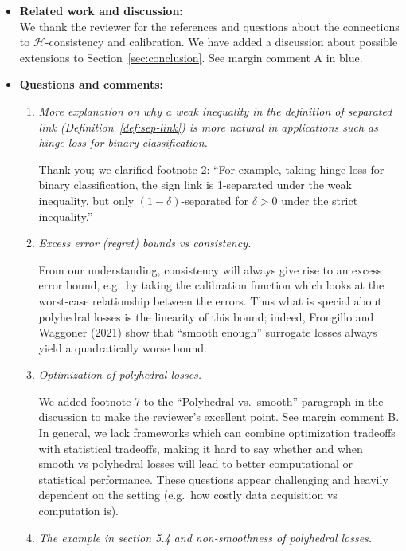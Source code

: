 \documentclass[a4paper]{article}
\begin{document}
\begin{itemize}
\item \textbf{Related work and discussion:}\\
 We thank the reviewer for the references and questions about the connections to $\mathcal{H}$-consistency and calibration. We have added a discussion about possible extensions to Section~\ref{sec:conclusion}. See margin comment A in blue.
  
\item \textbf{Questions and comments:}
  \begin{enumerate}
  \item \emph{More explanation on why a weak inequality in the definition of separated link (Definition~\ref{def:sep-link}) is more natural in applications such as hinge loss for binary classification.}

    Thank you; we clarified footnote 2: ``For example, taking hinge loss for binary classification, the sign link is 1-separated under the weak inequality, but only $(1-\delta)$-separated for $\delta > 0$ under the strict inequality.''
    
  \item \emph{Excess error (regret) bounds vs consistency.}

    From our understanding, consistency will always give rise to an excess error bound, e.g.\ by taking the calibration function which looks at the worst-case relationship between the errors.
    Thus what is special about polyhedral losses is the linearity of this bound; indeed, Frongillo and Waggoner (2021) show that ``smooth enough'' surrogate losses always yield a quadratically worse bound.
    
  \item \emph{Optimization of polyhedral losses.}

    We added footnote 7 to the ``Polyhedral vs.\ smooth'' paragraph in the discussion to make the reviewer's excellent point. 
    See margin comment B.
    In general, we lack frameworks which can combine optimization tradeoffs with statistical tradeoffs, making it hard to say whether and when smooth vs polyhedral losses will lead to better computational or statistical performance.
    These questions appear challenging and heavily dependent on the setting (e.g.\ how costly data acquisition vs computation is).
    
  \item \emph{The example in section 5.4 and non-smoothness of polyhedral losses.}


\end{enumerate}
\end{itemize}
\end{document}

